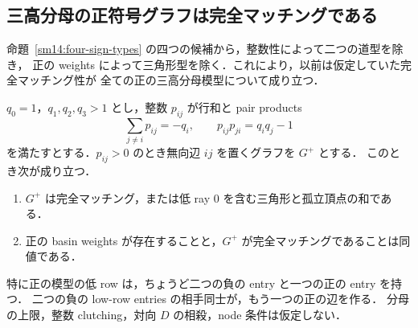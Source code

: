 \subsection{三高分母の正符号グラフは完全マッチングである}
\label{mh18:section}

命題~\ref{sm14:four-sign-types} の四つの候補から，整数性によって二つの道型を除き，
正の weights によって三角形型を除く．これにより，以前は仮定していた完全マッチング性が
全ての正の三高分母模型について成り立つ．

\begin{theorem}[三高分母の完全マッチング定理]
\label{mh18:matching}
$q_0=1$，$q_1,q_2,q_3>1$ とし，整数 $p_{ij}$ が行和と pair products
\[
 \sum_{j\ne i}p_{ij}=-q_i,\qquad p_{ij}p_{ji}=q_iq_j-1
\]
を満たすとする．$p_{ij}>0$ のとき無向辺 $ij$ を置くグラフを $G^+$ とする．
このとき次が成り立つ．
\begin{enumerate}
\item $G^+$ は完全マッチング，または低 ray $0$ を含む三角形と孤立頂点の和である．
\item 正の basin weights が存在することと，$G^+$ が完全マッチングであることは同値である．
\end{enumerate}
特に正の模型の低 row は，ちょうど二つの負の entry と一つの正の entry を持つ．
二つの負の low-row entries の相手同士が，もう一つの正の辺を作る．
分母の上限，整数 clutching，対向 $D$ の相殺，node 条件は仮定しない．
\end{theorem}

